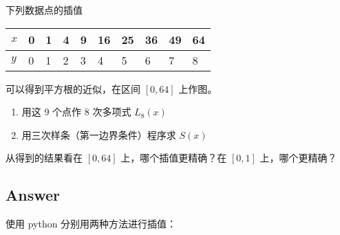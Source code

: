 \documentclass[11pt]{article}
\providecommand{\tightlist}{%
      \setlength{\itemsep}{0pt}\setlength{\parskip}{0pt}}
\begin{document}
下列数据点的插值

\begin{longtable}[]{@{}llllllllll@{}}
\toprule\noalign{}
\(x\) & 0 & 1 & 4 & 9 & 16 & 25 & 36 & 49 & 64 \\
\midrule\noalign{}
\endhead
\bottomrule\noalign{}
\endlastfoot
\(y\) & 0 & 1 & 2 & 3 & 4 & 5 & 6 & 7 & 8 \\
\end{longtable}

可以得到平方根的近似，在区间 \([0, 64]\) 上作图。

\begin{enumerate}
\def\labelenumi{(\arabic{enumi})}
\tightlist
\item
  用这 9 个点作 8 次多项式 \(L_8(x)\)
\item
  用三次样条（第一边界条件）程序求 \(S(x)\)
\end{enumerate}

从得到的结果看在 \([0, 64]\) 上，哪个插值更精确？在 \([0, 1]\)
上，哪个更精确？

\subsection{Answer}\label{answer}

使用 python 分别用两种方法进行插值：
\end{document}
